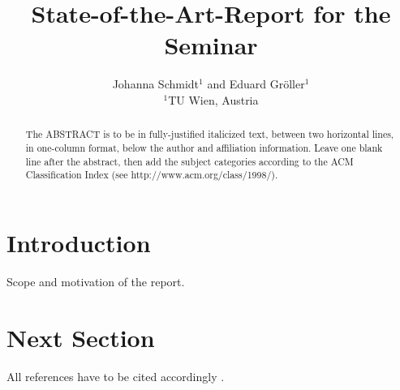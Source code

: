 \documentclass{egpubl}
\title[Seminar Report]{State-of-the-Art-Report for the Seminar}
\author[J. Schmidt \& E. Gr\"{o}ller]
       {Johanna Schmidt$^{1}$ and Eduard Gr\"{o}ller$^{1}$
        \\
         $^1$TU Wien, Austria}
\begin{document}


\maketitle

\begin{abstract}
   The ABSTRACT is to be in fully-justified italicized text, 
   between two horizontal lines,
   in one-column format, 
   below the author and affiliation information.
   Leave one blank line after the abstract, 
   then add the subject categories according to the ACM Classification Index 
   (see http://www.acm.org/class/1998/).

\begin{classification} %
\end{classification}

\end{abstract}



\section{Introduction}

Scope and motivation of the report.

\section{Next Section}

All references have to be cited accordingly \cite{FolDamFeiHug93}.
\end{document}
